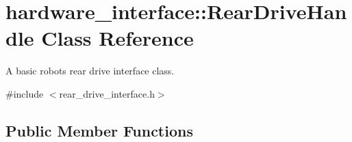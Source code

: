 \hypertarget{classhardware__interface_1_1RearDriveHandle}{}\section{hardware\+\_\+interface\+:\+:Rear\+Drive\+Handle Class Reference}
\label{classhardware__interface_1_1RearDriveHandle}


A basic robot\textquotesingle{}s rear drive interface class.  




{\ttfamily \#include $<$rear\+\_\+drive\+\_\+interface.\+h$>$}

\subsection*{Public Member Functions}
